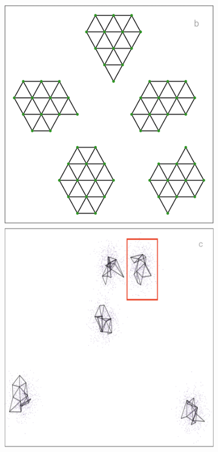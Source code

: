 \documentclass[
  12pt]{article}
\begin{document}
\begin{figure}[H]
\begin{minipage}{0.33\linewidth}
\includegraphics{figures/five_gau_clusters/2d_model_tsne.png}\end{minipage}%
%
\begin{minipage}{0.33\linewidth}
\includegraphics{figures/five_gau_clusters/sc_tsne_3.png}\end{minipage}%


\end{figure}
\end{document}
